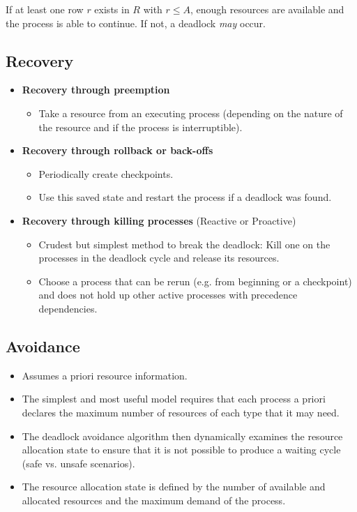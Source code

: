 					If at least one row \(r\) exists in \(R\) with \( r \leq A \), enough resources are available and the process is able to continue. If not, a deadlock \textit{may} occur.

		\subsection{Recovery}
			\begin{itemize}
				\item \textbf{Recovery through preemption}
					\begin{itemize}
						\item Take a resource from an executing process (depending on the nature of the resource and if the process is interruptible).
					\end{itemize}
				\item \textbf{Recovery through rollback or back-offs}
					\begin{itemize}
						\item Periodically create checkpoints.
						\item Use this saved state and restart the process if a deadlock was found.
					\end{itemize}
				\item \textbf{Recovery through killing processes} (Reactive or Proactive)
					\begin{itemize}
						\item Crudest but simplest method to break the deadlock: Kill one on the processes in the deadlock cycle and release its resources.
						\item Choose a process that can be rerun (e.g. from beginning or a checkpoint) and does not hold up other active processes with precedence dependencies.
					\end{itemize}
			\end{itemize}

		\subsection{Avoidance}
			\begin{itemize}
				\item Assumes a priori resource information.
				\item The simplest and most useful model requires that each process a priori declares the maximum number of resources of each type that it may need.
				\item The deadlock avoidance algorithm then dynamically examines the resource allocation state to ensure that it is not possible to produce a waiting cycle (safe vs. unsafe scenarios).
				\item The resource allocation state is defined by the number of available and allocated resources and the maximum demand of the process.
			\end{itemize}

